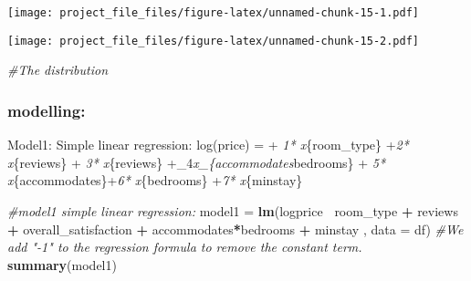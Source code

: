 \documentclass[]{article}
\newenvironment{Shaded}{\begin{snugshade}}{\end{snugshade}}
\newcommand{\KeywordTok}[1]{\textcolor[rgb]{0.13,0.29,0.53}{\textbf{#1}}}
\newcommand{\DataTypeTok}[1]{\textcolor[rgb]{0.13,0.29,0.53}{#1}}
\newcommand{\DecValTok}[1]{\textcolor[rgb]{0.00,0.00,0.81}{#1}}
\newcommand{\StringTok}[1]{\textcolor[rgb]{0.31,0.60,0.02}{#1}}
\newcommand{\CommentTok}[1]{\textcolor[rgb]{0.56,0.35,0.01}{\textit{#1}}}
\newcommand{\OperatorTok}[1]{\textcolor[rgb]{0.81,0.36,0.00}{\textbf{#1}}}
\newcommand{\NormalTok}[1]{#1}
\begin{document}
\texttt{[image: project\_file\_files/figure-latex/unnamed-chunk-15-1.pdf]}

\begin{Shaded}
\end{Shaded}

\texttt{[image: project\_file\_files/figure-latex/unnamed-chunk-15-2.pdf]}

\begin{Shaded}
\begin{Highlighting}[]
\CommentTok{#The distribution  }
\end{Highlighting}
\end{Shaded}

\subsubsection{modelling:}\label{modelling}

Model1: Simple linear regression: log(price) = \alpha + \beta\emph{1*
x}\{room\_type\} +\beta\emph{2* x}\{reviews\} + \beta\emph{3*
x}\{reviews\} +\beta\_4\emph{x\_\{accommodates}bedrooms\} +
\beta\emph{5* x}\{accommodates\}+\beta\emph{6* x}\{bedrooms\}
+\beta\emph{7* x}\{minstay\}

\begin{Shaded}
\begin{Highlighting}[]
\CommentTok{#model1 simple linear regression:}
\NormalTok{model1 =}\StringTok{ }\KeywordTok{lm}\NormalTok{(logprice}\OperatorTok{~}\StringTok{ }\NormalTok{room_type }\OperatorTok{+}\StringTok{ }\NormalTok{reviews }\OperatorTok{+}\StringTok{ }\NormalTok{overall_satisfaction }\OperatorTok{+}\StringTok{ }\NormalTok{accommodates}\OperatorTok{*}\NormalTok{bedrooms }\OperatorTok{+}\StringTok{ }\NormalTok{minstay , }\DataTypeTok{data =}\NormalTok{ df) }\CommentTok{#We add "-1" to the regression formula to remove the constant term.}
\KeywordTok{summary}\NormalTok{(model1)}
\end{Highlighting}
\end{Shaded}
\end{document}
